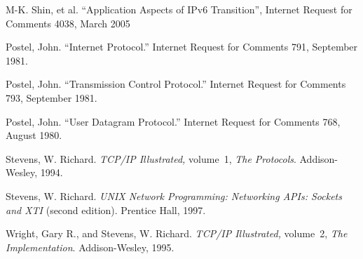 \begin{thebibliography}{99}
 M-K. Shin, et al.
``Application Aspects of IPv6 Transition'', Internet Request for
Comments 4038, March 2005

Postel, John. ``Internet Protocol.'' Internet Request for Comments
791, September 1981.

Postel, John. ``Transmission Control Protocol.'' Internet Request for Comments
793, September 1981.

Postel, John. ``User Datagram Protocol.'' Internet Request for Comments
768, August 1980.

Stevens, W. Richard. \emph{TCP/IP Illustrated,} volume~1, \emph{The Protocols}.
Addison-Wesley, 1994.

Stevens, W. Richard. \emph{UNIX Network Programming: Networking
APIs: Sockets and XTI} (second edition). Prentice Hall, 1997.

Wright, Gary  R., and Stevens, W. Richard. \emph{TCP/IP Illustrated,}
volume~2, \emph{The Implementation}. Addison-Wesley, 1995.

\end{thebibliography}
